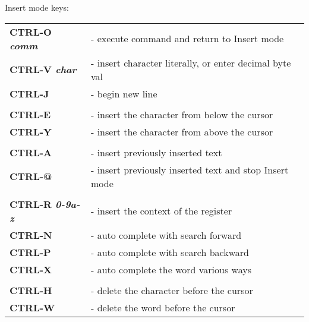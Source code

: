 \documentclass[a4paper,8pt]{extarticle}
\begin{document}
\begin{multicols*}{3}
        \noindent
        {\Huge Insert mode keys:}\\
        \begin{tabular}{ l l }
            \textbf{CTRL-O \textsl{comm}}       &    - execute command and return to Insert mode            \\
            \textbf{CTRL-V \textsl{char}}       &    - insert character literally, or enter decimal byte val\\
            \textbf{CTRL-J}                     &    - begin new line                                       \\
                                                &                                                           \\
            \textbf{CTRL-E}                     &    - insert the character from below the cursor           \\
            \textbf{CTRL-Y}                     &    - insert the character from above the cursor           \\
                                                &                                                           \\
            \textbf{CTRL-A}                     &    - insert previously inserted text                      \\
            \textbf{CTRL-@}                     &    - insert previously inserted text and stop Insert mode \\
                                                &                                                           \\
            \textbf{CTRL-R \textsl{0-9a-z}}     &    - insert the context of the register                   \\
            \textbf{CTRL-N}                     &    - auto complete with search forward                    \\
            \textbf{CTRL-P}                     &    - auto complete with search backward                   \\
            \textbf{CTRL-X}                     &    - auto complete the word various ways                  \\
                                                &                                                           \\
            \textbf{CTRL-H}                     &    - delete the character before the cursor               \\
            \textbf{CTRL-W}                     &    - delete the word before the cursor                    \\

\end{tabular}
\end{multicols*}
\end{document}
